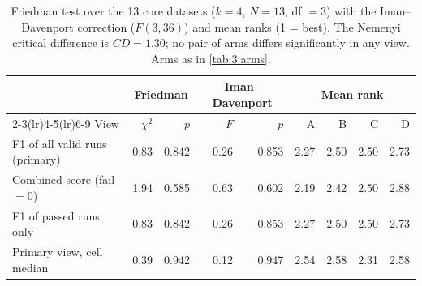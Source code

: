 \begin{table}[htbp]
  \centering
  \small
  \caption[Friedman test over the core datasets]{Friedman test over the 13 core datasets ($k = 4$, $N = 13$, df $= 3$) with the Iman--Davenport correction ($F(3, 36)$) and mean ranks (1 = best). The Nemenyi critical difference is $\mathit{CD} = 1.30$; no pair of arms differs significantly in any view. Arms as in \autoref{tab:3:arms}.}
  \label{tab:6:ranktests}
  \begin{tabular}{lrrrrrrrr}
    \toprule
     & \multicolumn{2}{c}{Friedman} & \multicolumn{2}{c}{Iman--Davenport} & \multicolumn{4}{c}{Mean rank} \\
    \cmidrule(lr){2-3}\cmidrule(lr){4-5}\cmidrule(lr){6-9}
    View & $\chi^2$ & $p$ & $F$ & $p$ & A & B & C & D \\
    \midrule
    F1 of all valid runs (primary) & 0.83 & 0.842 & 0.26 & 0.853 & 2.27 & 2.50 & 2.50 & 2.73 \\
    Combined score (fail $= 0$) & 1.94 & 0.585 & 0.63 & 0.602 & 2.19 & 2.42 & 2.50 & 2.88 \\
    F1 of passed runs only & 0.83 & 0.842 & 0.26 & 0.853 & 2.27 & 2.50 & 2.50 & 2.73 \\
    Primary view, cell median & 0.39 & 0.942 & 0.12 & 0.947 & 2.54 & 2.58 & 2.31 & 2.58 \\
    \bottomrule
  \end{tabular}
\end{table}
